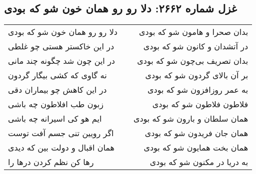 \begin{center}
\section*{غزل شماره ۲۶۶۲: دلا رو رو همان خون شو که بودی}
\label{sec:2662}
\begin{longtable}{l p{0.5cm} r}
دلا رو رو همان خون شو که بودی
&&
بدان صحرا و هامون شو که بودی
\\
در این خاکستر هستی چو غلطی
&&
در آتشدان و کانون شو که بودی
\\
در این چون شد چگونه چند مانی
&&
بدان تصریف بی‌چون شو که بودی
\\
نه گاوی که کشی بیگار گردون
&&
بر آن بالای گردون شو که بودی
\\
در این کاهش چو بیماران دقی
&&
به عمر روزافزون شو که بودی
\\
زبون طب افلاطون چه باشی
&&
فلاطون فلاطون شو که بودی
\\
ایم هو کی اسیرانه چه باشی
&&
همان سلطان و بارون شو که بودی
\\
اگر رویین تنی جسم آفت توست
&&
همان جان فریدون شو که بودی
\\
همان اقبال و دولت بین که دیدی
&&
همان بخت همایون شو که بودی
\\
رها کن نظم کردن درها را
&&
به دریا در مکنون شو که بودی
\\
\end{longtable}
\end{center}
